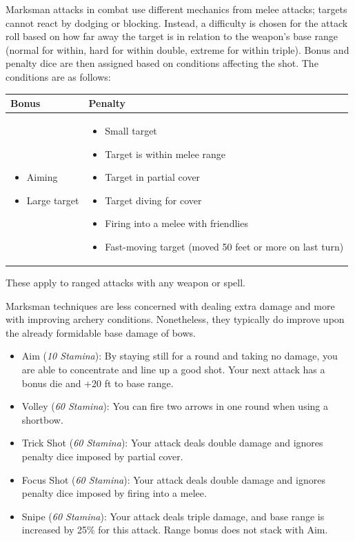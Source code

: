 \documentclass[12pt]{book}
\begin{document}
Marksman attacks in combat use different mechanics from melee attacks; targets cannot react by dodging or blocking. Instead, a difficulty is chosen for the attack roll based on how far away the target is in relation to the weapon's base range (normal for within, hard for within double, extreme for within triple). Bonus and penalty dice are then assigned based on conditions affecting the shot. The conditions are as follows:\\

\begin{tabular}{p{}|p{}}

Bonus & Penalty\\ \hline
	\begin{itemize}
		\item Aiming
		\item Large target
	\end{itemize}
	&
	\begin{itemize}
		\item Small target
		\item Target is within melee range
		\item Target in partial cover
		\item Target diving for cover
		\item Firing into a melee with friendlies
		\item Fast-moving target (moved 50 feet or more on last turn)
	\end{itemize}\\

\end{tabular}

These apply to ranged attacks with any weapon or spell.

Marksman techniques are less concerned with dealing extra damage and more with improving archery conditions. Nonetheless, they typically do improve upon the already formidable base damage of bows.

\begin{itemize}
	\item Aim (\textit{10 Stamina}): By staying still for a round and taking no damage, you are able to concentrate and line up a good shot. Your next attack has a bonus die and +20 ft to base range.
	\item Volley (\textit{60 Stamina}): You can fire two arrows in one round when using a shortbow.
	\item Trick Shot (\textit{60 Stamina}): Your attack deals double damage and ignores penalty dice imposed by partial cover.
	\item Focus Shot (\textit{60 Stamina}): Your attack deals double damage and ignores penalty dice imposed by firing into a melee.
	\item Snipe (\textit{60 Stamina}): Your attack deals triple damage, and base range is increased by 25\% for this attack. Range bonus does not stack with Aim.
\end{itemize}
\end{document}
